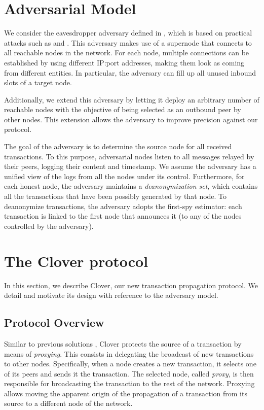 \documentclass{article}
\begin{document}
	
	
	\section{Adversarial Model}
	\label{sec:adversary}
	We consider the eavesdropper adversary defined in \cite{fanti2017anonymity}, which is based on practical attacks such as \cite{biryukov2014deanonymisation} and \cite{koshy2014analysis}.
	This adversary makes use of a supernode that connects to all reachable nodes in the network.
	For each node, multiple connections can be established by using different IP:port addresses, making them look as coming from different entities.
	In particular, the adversary can fill up all unused inbound slots of a target node.
	
	Additionally, we extend this adversary by letting it deploy an arbitrary number of reachable nodes 
	with the objective of being selected as an outbound peer by other nodes.
	This extension allows the adversary to improve precision against our protocol.
	
	The goal of the adversary is to determine the source node for all received transactions.
	To this purpose, adversarial nodes listen to all messages relayed by their peers, logging their content and timestamp.
	We assume the adversary has a unified view of the logs from all the nodes under its control.
	Furthermore, for each honest node, the adversary maintains a \textit{deanonymization set}, which contains all the transactions that have been possibly generated by that node.
	To deanonymize transactions, the adversary adopts the first-spy estimator: each transaction is linked to the first node that announces it (to any of the nodes controlled by the adversary).
	
	
	\section{The Clover protocol}
	In this section, we describe Clover, our new transaction propagation protocol.
	We detail and motivate its design with reference to the adversary model.
	
	\subsection{Protocol Overview}
	Similar to previous solutions \cite{venkatakrishnan2017dandelion,franzoni2020improving}, Clover protects the source of a transaction by means of \textit{proxying}.
	This consists in delegating the broadcast of new transactions to other nodes.
	Specifically, when a node creates a new transaction, it selects one of its peers and sends it the transaction.
	The selected node, called \textit{proxy}, is then responsible for broadcasting the transaction to the rest of the network.
	Proxying allows moving the apparent origin of the propagation of a transaction from its source to a different node of the network.
	
\end{document}
